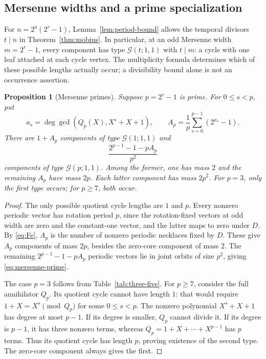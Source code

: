 \documentclass[11pt]{article}
\newtheorem{proposition}[theorem]{Proposition}
\theoremstyle{definition}
\theoremstyle{remark}
\numberwithin{equation}{section}
\newcommand{\G}{\mathcal G}
\begin{document}
\subsection{Mersenne widths and a prime specialization}

For $n=2^a(2^r-1)$, Lemma~\ref{lem:period-bound} allows the temporal
divisors $t\mid n$ in Theorem~\ref{thm:mobius}. In particular, at an odd
Mersenne width $m=2^r-1$, every component has type $\G(t;1,1)$ with
$t\mid m$: a cycle with one leaf attached at each cycle vertex.
The multiplicity formula determines which of these possible lengths
actually occur; a divisibility bound alone is not an occurrence assertion.

\begin{proposition}[Mersenne primes]\label{prop:mersenne-prime}
Suppose $p=2^r-1$ is prime. For $0\le s<p$, put
\[
 a_s=\deg\gcd\left(Q_p(X),X^s+X+1\right),\qquad
 A_p=\frac1p\sum_{s=0}^{p-1}(2^{a_s}-1).
\]
There are $1+A_p$ components of type $\G(1;1,1)$ and
\begin{equation}\label{eq:mersenne-prime}
 \frac{2^{p-1}-1-pA_p}{p^2}
\end{equation}
components of type $\G(p;1,1)$. Among the former, one has mass $2$
and the remaining $A_p$ have mass $2p$. Each latter component has mass
$2p^2$. For $p=3$, only the first type occurs; for $p\ge7$, both occur.
\end{proposition}

\begin{proof}
The only possible quotient cycle lengths are $1$ and $p$. Every nonzero
periodic vector has rotation period $p$, since the rotation-fixed vectors
at odd width are zero and the constant-one vector, and the latter maps
to zero under $D$. By \eqref{eq:Fe}, $A_p$ is the number of nonzero
periodic necklaces fixed by $D$. These give $A_p$ components of mass
$2p$, besides the zero-core component of mass $2$. The remaining
$2^{p-1}-1-pA_p$ periodic vectors lie in joint orbits of size $p^2$,
giving \eqref{eq:mersenne-prime}.

The case $p=3$ follows from Table~\ref{tab:three-five}. For $p\ge7$,
consider the full annihilator $Q_p$. Its quotient cycle cannot have
length $1$: that would require $1+X=X^s\pmod{Q_p}$ for some
$0\le s<p$. The nonzero polynomial $X^s+X+1$ has degree at most
$p-1$. If its degree is smaller, $Q_p$ cannot divide it. If its degree
is $p-1$, it has three nonzero terms, whereas
$Q_p=1+X+\cdots+X^{p-1}$ has $p$ terms. Thus its quotient cycle has
length $p$, proving existence of the second type. The zero-core component
always gives the first.
\end{proof}
\end{document}
